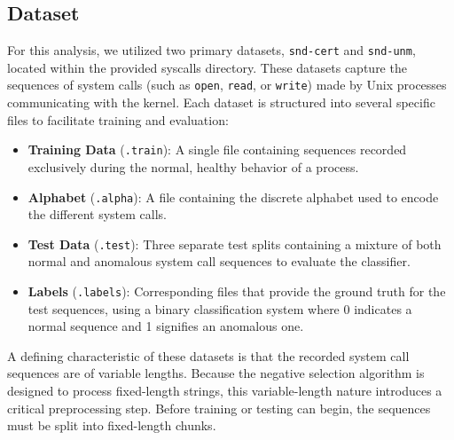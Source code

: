 \documentclass{article}
\begin{document}
\subsection{Dataset}
For this analysis, we utilized two primary datasets, \texttt{snd-cert} and \texttt{snd-unm}, located within the provided syscalls directory. These datasets capture the sequences of system calls (such as \texttt{open}, \texttt{read}, or \texttt{write}) made by Unix processes communicating with the kernel. Each dataset is structured into several specific files to facilitate training and evaluation:
\begin{itemize}
    \item \textbf{Training Data} (\texttt{.train}): A single file containing sequences recorded exclusively during the normal, healthy behavior of a process.
    \item \textbf{Alphabet} (\texttt{.alpha}): A file containing the discrete alphabet used to encode the different system calls.
    \item \textbf{Test Data} (\texttt{.test}): Three separate test splits containing a mixture of both normal and anomalous system call sequences to evaluate the classifier.
    \item \textbf{Labels} (\texttt{.labels}): Corresponding files that provide the ground truth for the test sequences, using a binary classification system where 0 indicates a normal sequence and 1 signifies an anomalous one.
\end{itemize}
A defining characteristic of these datasets is that the recorded system call sequences are of variable lengths. Because the negative selection algorithm is designed to process fixed-length strings, this variable-length nature introduces a 
critical preprocessing step. Before training or testing can begin, the sequences must be split into fixed-length chunks.
\end{document}
